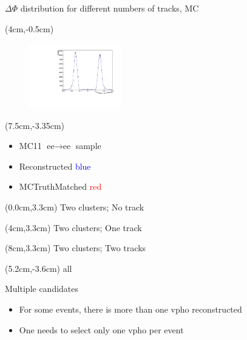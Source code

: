 \documentclass[10pt]{beamer}
\begin{document}
{\begin{frame}{$\Delta \Phi$ distribution for different numbers of tracks, MC}
\begin{textblock*}{\textwidth}(4cm,-0.5cm)
	\begin{figure}
		\includegraphics[width=4cm]{Plots/MCee}
	\end{figure}
	
\end{textblock*}	

\begin{textblock*}{\textwidth}(7.5cm,-3.35cm)
	\begin{itemize}
		\item MC11 $\textrm{ee} \rightarrow \textrm{ee}$ sample
		\item Reconstructed \textcolor{blue}{blue}
		\item MCTruthMatched \textcolor{red}{red}
	\end{itemize}
	
\end{textblock*}

\begin{textblock*}{0.2\textwidth}(0.0cm,3.3cm)
 Two clusters; No track
\end{textblock*}

\begin{textblock*}{0.2\textwidth}(4cm,3.3cm)
	Two clusters; One track
\end{textblock*}

\begin{textblock*}{0.2\textwidth}(8cm,3.3cm)
	Two clusters; Two tracks
\end{textblock*}


\begin{textblock*}{\textwidth}(5.2cm,-3.6cm)
	all
\end{textblock*}


\end{frame}



\begin{frame}{Multiple candidates}
	
	\begin{itemize}
		\item For some events, there is more than one vpho reconstructed
		\item One needs to select only one vpho per event
	\end{itemize}
	

\end{frame}}
\end{document}

